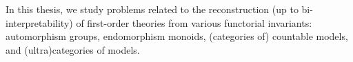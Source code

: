 In this thesis, we study problems related to the reconstruction (up to bi-interpretability) of first-order theories from various functorial invariants: automorphism groups, endomorphism monoids, (categories of) countable models, and (ultra)categories of models.